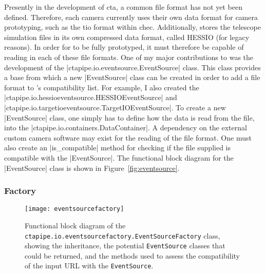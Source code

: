 Presently in the development of \gls{cta}, a common file format has not yet been defined. Therefore, each camera currently uses their own data format for camera prototyping, such as the \gls{tio} format within \gls{chec}. Additionally,  stores the telescope simulation files in its own compressed data format, called HESSIO (for legacy reasons). In order for  to be fully prototyped, it must therefore be capable of reading in each of these file formats. One of my major contributions to  was the development of the |ctapipe.io.eventsource.EventSource| class. This class provides a base from which a new |EventSource| class can be created in order to add a file format to 's compatibility list. For example, I also created the |ctapipe.io.hessioeventsource.HESSIOEventSource| and |ctapipe.io.targetioeventsource.TargetIOEventSource|. To create a new |EventSource| class, one simply has to define how the data is read from the file, into the |ctapipe.io.containers.DataContainer|. A dependency on the external custom camera software may exist for the reading of the file format. One must also create an |is_compatible| method for checking if the file supplied is compatible with the |EventSource|. The functional block diagram for the |EventSource| class is shown in Figure~\ref{fig:eventsource}.

\subsubsection{Factory}

\begin{figure}
  \centering
  \texttt{[image: eventsourcefactory]}
  \caption[Functional block diagram of the EventSourceFactory class.]{Functional block diagram of the \lstinline{ctapipe.io.eventsourcefactory.EventSourceFactory} class, showing the inheritance, the potential \lstinline{EventSource} classes that could be returned, and the methods used to assess the compatibility of the input URL with the \lstinline{EventSource}.}
  \label{fig:eventsourcefactory}
\end{figure}


